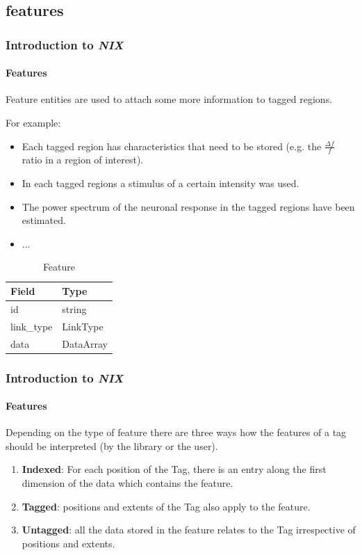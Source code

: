\documentclass[pdftex, xcolor=table]{beamer}
\newcommand{\nix}{\textit{NIX}}
\begin{document}
\subsection{features}

\begin{frame}
  \frametitle{Introduction to \nix{}}
  \framesubtitle{Features}
  Feature entities are used to attach some more information to tagged regions.

  For example:
  \begin{itemize}
  \item Each tagged region has characteristics that need to be stored
    (e.g. the $\frac{\Delta f}{f}$ ratio in a region of interest).
  \item In each tagged regions a stimulus of a certain intensity was used.
  \item The power spectrum of the neuronal response in the tagged
    regions have been estimated.
  \item ...
  \end{itemize}
  \pause{}
  \begin{table}[]
    \scriptsize
    \centering
    \captionsetup{labelformat=empty}
    \caption{Feature}
    \begin{tabular}{|l|l|}
      \hline
      \rowcolor[HTML]{EFEFEF} 
      Field                   & Type             \\ \hline
      id                      & string           \\ \hline
      link\_type              & LinkType         \\ \hline
      data                    & DataArray        \\ \hline
    \end{tabular}
  \end{table}
  \normalsize
\end{frame}

\begin{frame}
  \frametitle{Introduction to \nix{}}
  \framesubtitle{Features}
  Depending on the type of feature there are three ways how the
  features of a tag should be interpreted (by the library or the
  user).
  \pause{}
  \begin{enumerate}
  \item \textbf{Indexed}: For each position of the Tag, there is an entry along
    the first dimension of the data which contains the feature.
  \item \textbf{Tagged}: positions and extents of the Tag also apply
    to the feature.
  \item \textbf{Untagged}: all the data stored in the feature relates
    to the Tag irrespective of positions and extents.
  \end{enumerate}
\end{frame}
\end{document}
